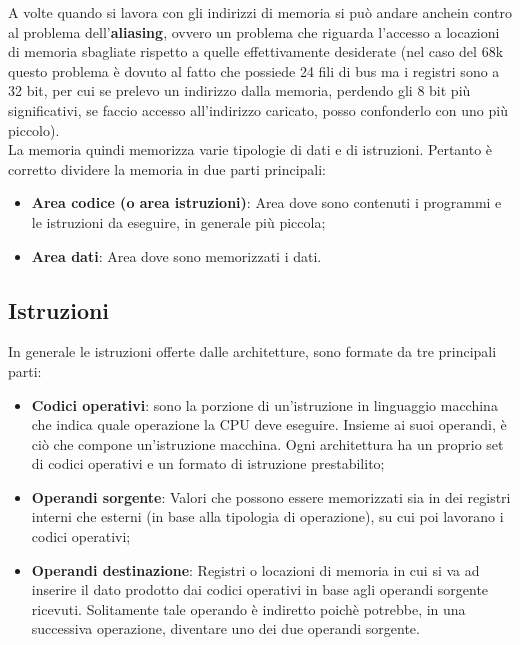 A volte quando si lavora con gli indirizzi di memoria si può andare anchein contro al problema dell'\textbf{aliasing}, ovvero un problema che riguarda l'accesso a locazioni di memoria sbagliate rispetto a quelle effettivamente desiderate (nel caso del 68k questo problema è dovuto al fatto che possiede 24 fili di bus ma i registri sono a 32 bit, per cui se prelevo un indirizzo dalla memoria, perdendo gli 8 bit più significativi, se faccio accesso all'indirizzo caricato, posso confonderlo con uno più piccolo).
\\
La memoria quindi memorizza varie tipologie di dati e di istruzioni. Pertanto è corretto dividere la memoria in due parti principali:

\begin{itemize}
    \item \textbf{Area codice (o area istruzioni)}: Area dove sono contenuti i programmi e le istruzioni da eseguire, in generale più piccola;
    \item \textbf{Area dati}: Area dove sono memorizzati i dati.
\end{itemize}

\subsection{Istruzioni}\label{par:istruzioni}
In generale le istruzioni offerte dalle architetture, sono formate da tre principali parti:
\begin{itemize}
    \item \textbf{Codici operativi}: sono la porzione di un'istruzione in linguaggio macchina che indica quale operazione la CPU deve eseguire. Insieme ai suoi operandi, è ciò che compone un'istruzione macchina. Ogni architettura ha un proprio set di codici operativi e un formato di istruzione prestabilito;

    \item \textbf{Operandi sorgente}: Valori che possono essere memorizzati sia in dei registri interni che esterni (in base alla tipologia di operazione), su cui poi lavorano i codici operativi;

    \item \textbf{Operandi destinazione}: Registri o locazioni di memoria in cui si va ad inserire il dato prodotto dai codici operativi in base agli operandi sorgente ricevuti. Solitamente tale operando è indiretto poichè potrebbe, in una successiva operazione, diventare uno dei due operandi sorgente.
\end{itemize}

